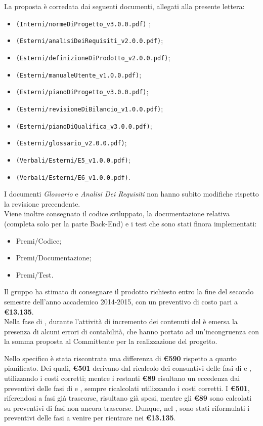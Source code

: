 \documentclass[12pt,a4paper]{article} %
\begin{document}
La proposta è corredata dai seguenti documenti, allegati alla presente lettera:
\begin{itemize}
\item \normeDiProgetto \texttt{(Interni/normeDiProgetto\_v3.0.0.pdf)} ;
\item \analisiDeiRequisiti \texttt{(Esterni/analisiDeiRequisiti\_v2.0.0.pdf)};
\item {} \texttt{(Esterni/definizioneDiProdotto\_v2.0.0.pdf)};
\item \manualeUtente \texttt{(Esterni/manualeUtente\_v1.0.0.pdf)};
\item \pianoDiProgetto \texttt{(Esterni/pianoDiProgetto\_v3.0.0.pdf)};
\item \revisioneDiBilancio \texttt{(Esterni/revisioneDiBilancio\_v1.0.0.pdf)};
\item \pianoDiQualifica \texttt{(Esterni/pianoDiQualifica\_v3.0.0.pdf)};
\item \glossario \texttt{(Esterni/glossario\_v2.0.0.pdf)};
\item \eV \texttt{(Verbali/Esterni/E5\_v1.0.0.pdf)};
\item \eVI \texttt{(Verbali/Esterni/E6\_v1.0.0.pdf)}.
\end{itemize}
\noindent I documenti \textit{Glossario} e \textit{Analisi Dei Requisiti} non hanno subito modifiche rispetto la revisione precendente.
\\
Viene inoltre consegnato il codice sviluppato, la documentazione relativa (completa solo per la parte Back-End) e i test che sono stati finora implementati:
\begin{itemize}
\item Premi/Codice;
\item Premi/Documentazione;
\item Premi/Test.
\end{itemize}
Il gruppo \gruppo ha stimato di consegnare il prodotto richiesto entro la fine del secondo semestre dell'anno accademico 2014-2015, con un preventivo di costo pari a \textbf{\euro13.135}. \newline
\\
Nella fase di \fC, durante l'attività di incremento dei contenuti del \PP è emersa la presenza di alcuni errori di contabilità, che hanno portato ad un'incongruenza con la somma proposta al Committente per la realizzazione del progetto.

Nello specifico è stata riscontrata una differenza di \textbf{\euro590} rispetto a quanto pianificato.
Dei quali, \textbf{\euro501} derivano dal ricalcolo dei consuntivi delle fasi di \fPA e \fPD, utilizzando i costi corretti; mentre i restanti \textbf{\euro89} risultano un eccedenza dai preventivi delle fasi di \fC e \fVV, sempre ricalcolati utilizzando i costi corretti. I \textbf{\euro501}, riferendosi a fasi già trascorse, risultano già spesi, mentre gli \textbf{\euro89} sono calcolati su preventivi di fasi non ancora trascorse. Dunque, nel \PP, sono stati riformulati i preventivi delle fasi a venire per rientrare nei \textbf{\euro13.135}.
\end{document}
